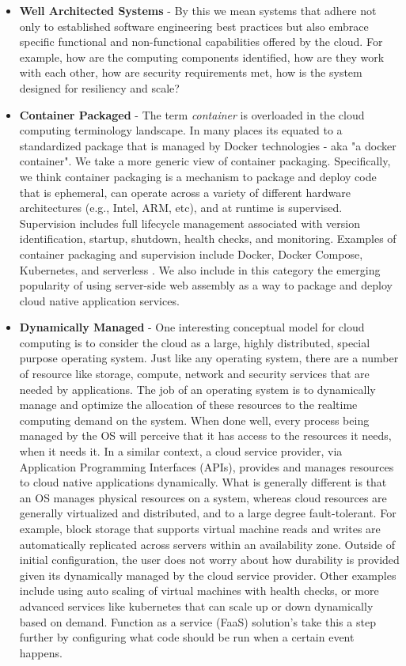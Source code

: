 \documentclass[conference]{IEEEconf}
\begin{document}
\begin{itemize}
	\item \textbf{Well Architected Systems} - By this we mean systems that adhere not only to established software engineering best practices but also embrace specific functional and non-functional capabilities offered by the cloud. For example, how are the computing components identified, how are they work with each other, how are security requirements met, how is the system designed for resiliency and scale?
	
	\item  \textbf{Container Packaged} - The term \textit{container} is overloaded in the cloud computing terminology landscape.  In many places its equated to a standardized package that is managed by Docker\cite{DockerContainer} technologies - aka "a docker container".  We take a more generic view of container packaging. Specifically, we think container packaging is a mechanism to package and deploy code that is ephemeral, can operate across a variety of different hardware architectures (e.g., Intel, ARM, etc), and at runtime is supervised.  Supervision includes full lifecycle management associated with version identification, startup, shutdown, health checks, and monitoring.  Examples of container packaging and supervision include Docker, Docker Compose, Kubernetes, and serverless \cite{baldini2017serverless}. We also include in this category the emerging popularity of using server-side web assembly\cite{haas2017bringing, bosshard2020use} as a way to package and deploy cloud native application services. 

	\item \textbf{Dynamically Managed} - One interesting conceptual model for cloud computing is to consider the cloud as a large, highly distributed, special purpose operating system. Just like any operating system, there are a number of resource like storage, compute, network and security services that are needed by applications.  The job of an operating system is to dynamically manage and optimize the allocation of these resources to the realtime computing demand on the system.  When done well, every process being managed by the OS will perceive that it has access to the resources it needs, when it needs it.  In a similar context, a cloud service provider, via Application Programming Interfaces (APIs), provides and manages resources to cloud native applications dynamically. What is generally different is that an OS manages physical resources on a system, whereas cloud resources are generally virtualized and distributed, and to a large degree fault-tolerant.  For example, block storage that supports virtual machine reads and writes are automatically replicated across servers within an availability zone. Outside of initial configuration, the user does not worry about how durability is provided given its dynamically managed by the cloud service provider. Other examples include using auto scaling of virtual machines with health checks, or more advanced services like kubernetes\cite{kubernetes} that can scale up or down dynamically based on demand. Function as a service (FaaS) solution's take this a step further by configuring what code should be run when a certain event happens.     
	

\end{itemize}
\end{document}
